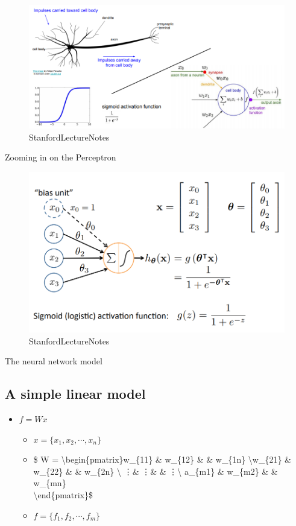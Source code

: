 \documentclass[11pt]{article}
\makeatletter
\def\maxwidth{\ifdim\Gin@nat@width>\linewidth\linewidth
    \else\Gin@nat@width\fi}
\let\Oldincludegraphics\includegraphics
\renewcommand{\includegraphics}[1]{\Oldincludegraphics[width=.8\maxwidth]{#1}}
\providecommand{\tightlist}{%
      \setlength{\itemsep}{0pt}\setlength{\parskip}{0pt}}
\makeatother
\begin{document}
\begin{figure}
\centering
\includegraphics{pres_imgs/neuron_and_perceptron.png}
\caption{StanfordLectureNotes}
\end{figure}

    Zooming in on the Perceptron

\begin{figure}
\centering
\includegraphics{pres_imgs/perceptron.png}
\caption{StanfordLectureNotes}
\end{figure}

    The neural network model

\hypertarget{a-simple-linear-model}{%
\subsection{A simple linear model}\label{a-simple-linear-model}}

\begin{itemize}
\tightlist
\item
  \(f = Wx\)

  \begin{itemize}
  \tightlist
  \item
    \(x=\{x_1, x_2,\cdots,x_n\}\)
  \item
    \$ W = \textbackslash{}begin\{pmatrix\}w\_\{11\} \& w\_\{12\} \&
    \cdots \& w\_\{1n\} \textbackslash{}w\_\{21\} \& w\_\{22\} \&
    \cdots \& w\_\{2n\} \textbackslash{} \vdots\& \vdots \& \ddots \&
    \vdots \textbackslash{} a\_\{m1\} \& w\_\{m2\} \& \cdots \&
    w\_\{mn\}\\
    \textbackslash{}end\{pmatrix\}\$
  \item
    \(f = \{f_1, f_2,\cdots,f_m\}\)
  \end{itemize}
\end{itemize}
\end{document}
